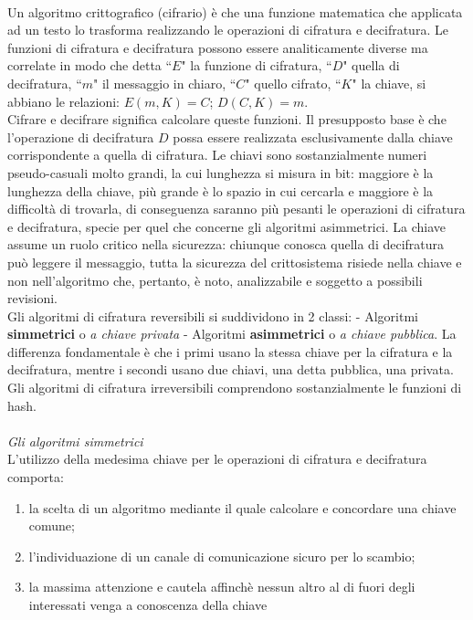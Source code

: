 \documentclass[a4paper,12pt]{tesiinfo}
\begin{document}
\\
Un algoritmo crittografico (cifrario) \`e che una funzione matematica che applicata ad un testo lo trasforma realizzando le operazioni di cifratura e decifratura. Le funzioni di cifratura e decifratura possono essere analiticamente diverse ma correlate in modo che detta ``$E$"  la funzione di cifratura, ``$D$" quella di decifratura, ``$m$" il messaggio in chiaro, ``$C$" quello cifrato, ``$K$" la chiave, si abbiano le relazioni:  $E(m, K) = C$; $D(C, K) = m$.
\\
Cifrare e decifrare significa calcolare queste funzioni. Il presupposto base \`e che l'operazione di decifratura $D$ possa essere realizzata esclusivamente dalla chiave corrispondente a quella di cifratura. Le chiavi sono sostanzialmente numeri pseudo-casuali molto grandi, la cui lunghezza si misura in bit: maggiore \`e la lunghezza della chiave, pi\`u grande \`e lo spazio in cui cercarla e maggiore \`e la difficolt\`a di trovarla, di conseguenza saranno pi\`u pesanti le operazioni di cifratura e decifratura, specie per quel che concerne gli algoritmi asimmetrici. La chiave assume un ruolo critico nella sicurezza: chiunque conosca quella di decifratura pu\`o leggere il messaggio, tutta la sicurezza del crittosistema risiede nella chiave e non nell'algoritmo che, pertanto, \`e noto, analizzabile e soggetto a possibili revisioni.
\\
Gli algoritmi di cifratura reversibili si suddividono in 2 classi: - Algoritmi \textbf{simmetrici} o \textit{a chiave privata} - Algoritmi \textbf{asimmetrici} o \textit{a chiave pubblica}. La differenza fondamentale \`e che i primi usano la stessa chiave per la cifratura e la decifratura, mentre i secondi usano due chiavi, una detta pubblica, una privata. Gli algoritmi di cifratura irreversibili comprendono sostanzialmente le funzioni di hash.
\\
\\
\textit{Gli algoritmi simmetrici}
\\
L'utilizzo della medesima chiave per le operazioni di cifratura e decifratura comporta: 
\begin{enumerate}
    \item la scelta di un algoritmo mediante il quale calcolare e concordare una chiave comune;
    \item l'individuazione di un canale di comunicazione sicuro per lo scambio;
    \item la massima attenzione e cautela affinch\`e nessun altro al di fuori degli interessati venga a conoscenza della chiave
\end{enumerate}
\end{document}
